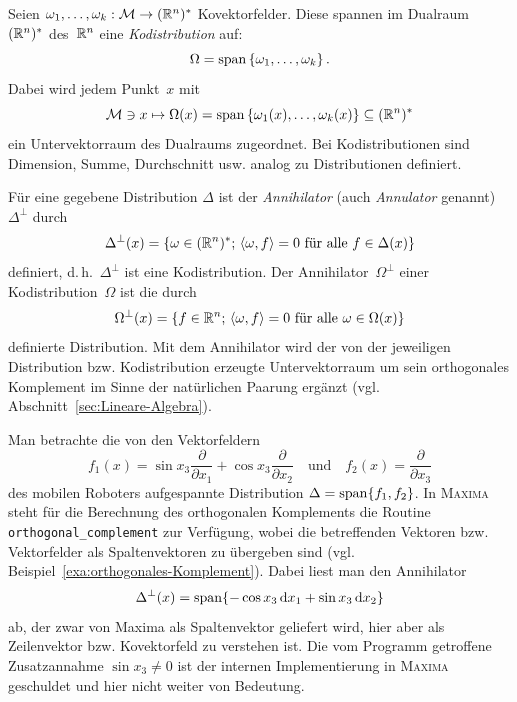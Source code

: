 Seien $\omega_{1},\ldots,\omega_{k}:\mathcal{M}\to({\mathbb{R}}^{n})^{*}$ Kovektorfelder.
Diese spannen im Dualraum~$({\mathbb{R}}^{n})^{*}$ des~${\mathbb{R}}^{n}$ eine \emph{Kodistribution}
auf: 
\[
\Omega={\operatorname{span}}\left\{ \omega_{1},\ldots,\omega_{k}\right\} .
\]
 Dabei wird jedem Punkt~$x$ mit
\[
\mathcal{M}\ni x\mapsto\Omega(x)={\operatorname{span}}\left\{ \omega_{1}(x),\ldots,\omega_{k}(x)\right\} \subseteq({\mathbb{R}}^{n})^{*}
\]
ein Untervektorraum des Dualraums zugeordnet. Bei Kodistributionen
sind Dimension, Summe, Durchschnitt usw. analog zu Distributionen
definiert.

\medskip{}

Für eine gegebene Distribution $\Delta$ ist der \emph{Annihilator}
(auch \emph{Annulator} genannt)~$\Delta^{\perp}$
durch 
\[
\Delta^{\perp}(x)=\left\{ \omega\in({\mathbb{R}}^{n})^{*};\,\left\langle \omega,f\right\rangle =0\mbox{ für alle }f\in\Delta(x)\right\} 
\]
definiert, d.\,h.~$\Delta^{\perp}$ ist eine Kodistribution. Der
Annihilator~$\Omega^{\perp}$ einer Kodistribution~$\Omega$
ist die durch 
\[
\Omega^{\perp}(x)=\left\{ f\in{\mathbb{R}}^{n};\,\left\langle \omega,f\right\rangle =0\mbox{ für alle }\omega\in\Omega(x)\right\} 
\]
definierte Distribution. Mit dem Annihilator wird der von der jeweiligen
Distribution bzw. Kodistribution erzeugte Untervektorraum um sein
orthogonales Komplement im Sinne der natürlichen Paarung ergänzt (vgl.
Abschnitt~\ref{sec:Lineare-Algebra}).

\begin{example}
\label{exa:Annihilator1}Man betrachte die von den Vektorfeldern 
\[
f_{1}(x)=\sin x_{3}\frac{\partial}{\partial x_{1}}+\cos x_{3}\frac{\partial}{\partial x_{2}}\quad\mbox{und}\quad f_{2}(x)=\frac{\partial}{\partial x_{3}}
\]
des mobilen Roboters aufgespannte Distribution $\Delta={\operatorname{span}}\{f_{1},f_{2}\}$.
In \textsc{Maxima} steht für die Berechnung des orthogonalen Komplements
die Routine \hbox{\texttt{orthogonal\_complement}} zur Verfügung,
wobei die betreffenden Vektoren bzw. Vektorfelder als Spaltenvektoren
zu übergeben sind (vgl. Beispiel~\ref{exa:orthogonales-Komplement}).
Dabei liest man den Annihilator 
\[
\Delta^{\perp}(x)={\operatorname{span}}\{-\cos x_{3}\,{\mathrm{d}} x_{1}+\sin x_{3}\,{\mathrm{d}} x_{2}\}
\]
ab, der zwar von Maxima als Spaltenvektor geliefert wird, hier aber
als Zeilenvektor bzw. Kovektorfeld zu verstehen ist. Die vom Programm
getroffene Zusatzannahme $\sin x_{3}\neq0$ ist der internen Implementierung
in \textsc{Maxima} geschuldet und hier nicht weiter von Bedeutung.

\begin{maxima}\end{maxima}
\end{example}


